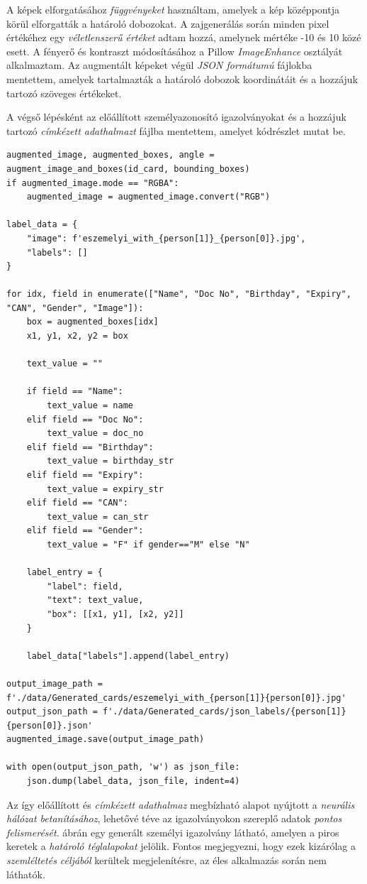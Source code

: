 \documentclass[
]{thesis-ekf}
\theoremstyle{definition}
\theoremstyle{remark}
\begin{document}
A képek elforgatásához \emph{függvényeket} használtam, amelyek a kép középpontja körül elforgatták a határoló dobozokat. A zajgenerálás során minden pixel értékéhez egy \emph{véletlenszerű értéket} adtam hozzá, amelynek mértéke -10 és 10 közé esett. A fényerő és kontraszt módosításához a Pillow \emph{ImageEnhance} osztályát alkalmaztam. Az augmentált képeket végül \emph{JSON formátumú} fájlokba mentettem, amelyek tartalmazták a határoló dobozok koordinátáit és a hozzájuk tartozó szöveges értékeket.

A végső lépésként az előállított személyazonosító igazolványokat és a hozzájuk tartozó \emph{címkézett adathalmazt} fájlba mentettem, amelyet  kódrészlet mutat be.

\begin{lstlisting}[style=mypython, caption={Augmentáció és fájlmentés}, label=kod-python2]
augmented_image, augmented_boxes, angle = augment_image_and_boxes(id_card, bounding_boxes)
if augmented_image.mode == "RGBA":
	augmented_image = augmented_image.convert("RGB")

label_data = {
	"image": f'eszemelyi_with_{person[1]}_{person[0]}.jpg',
	"labels": []
}

for idx, field in enumerate(["Name", "Doc No", "Birthday", "Expiry", "CAN", "Gender", "Image"]):
	box = augmented_boxes[idx]
	x1, y1, x2, y2 = box
	
	text_value = ""
	
	if field == "Name":
		text_value = name
	elif field == "Doc No":
		text_value = doc_no
	elif field == "Birthday":
		text_value = birthday_str
	elif field == "Expiry":
		text_value = expiry_str
	elif field == "CAN":
		text_value = can_str
	elif field == "Gender":
		text_value = "F" if gender=="M" else "N"
	
	label_entry = {
		"label": field,
		"text": text_value,
		"box": [[x1, y1], [x2, y2]]
	}
	
	label_data["labels"].append(label_entry)

output_image_path = f'./data/Generated_cards/eszemelyi_with_{person[1]}{person[0]}.jpg'
output_json_path = f'./data/Generated_cards/json_labels/{person[1]}{person[0]}.json'
augmented_image.save(output_image_path)

with open(output_json_path, 'w') as json_file:
	json.dump(label_data, json_file, indent=4)
\end{lstlisting}

Az így előállított és \emph{címkézett adathalmaz} megbízható alapot nyújtott a \emph{neurális hálózat betanításához}, lehetővé téve az igazolványokon szereplő adatok \emph{pontos felismerését}.  ábrán egy generált személyi igazolvány látható, amelyen a piros keretek a \emph{határoló téglalapokat} jelölik. Fontos megjegyezni, hogy ezek kizárólag a \emph{szemléltetés céljából} kerültek megjelenítésre, az éles alkalmazás során nem láthatók.
\end{document}
